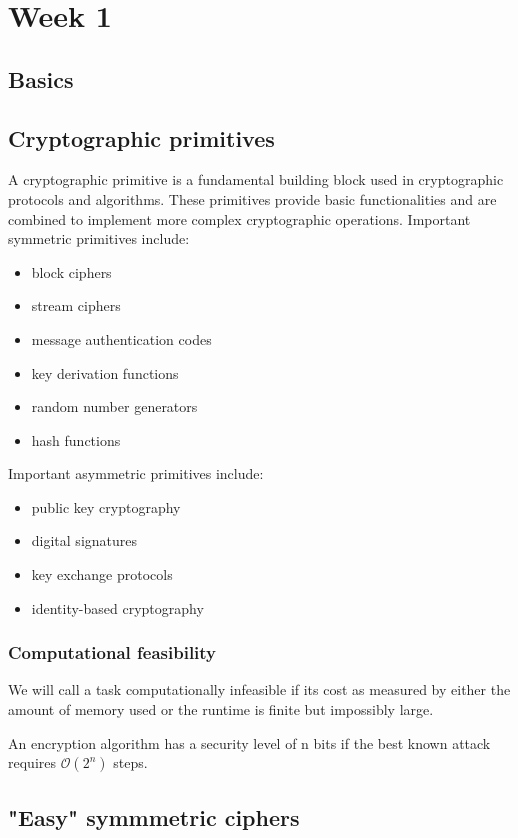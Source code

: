 \documentclass{article}
\theoremstyle{mytheoremstyle}
\begin{document}
    \section{Week 1}
    \subsection{Basics}
    \subsection{Cryptographic primitives}
    A cryptographic primitive is a fundamental building block used in cryptographic protocols and algorithms. These primitives provide basic functionalities and are combined to implement more complex cryptographic operations.
    Important symmetric primitives include:
    \begin{itemize}
        \item block ciphers
        \item stream ciphers
        \item message authentication codes
        \item key derivation functions 
        \item random number generators
        \item hash functions 
    \end{itemize}
    Important asymmetric primitives include:
    \begin{itemize}
        \item public key cryptography
        \item digital signatures
        \item key exchange protocols
        \item identity-based cryptography
    \end{itemize}
    \subsubsection{Computational feasibility}
    We will call a task computationally infeasible if its cost as measured by either the amount of memory used or the runtime is finite but impossibly large.

    An encryption algorithm has a security level of n bits if the best known attack requires $\mathcal{O}(2^n)$ steps.
    \subsection{"Easy" symmmetric ciphers}
\end{document}
